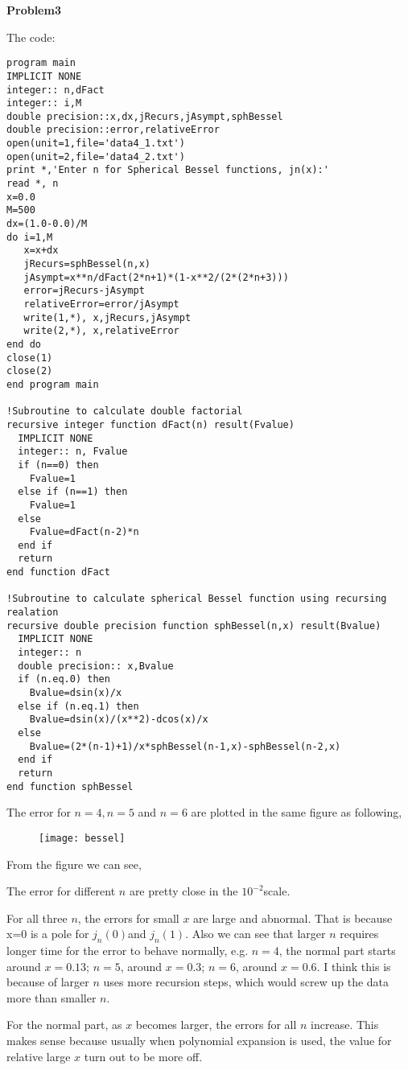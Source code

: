\documentclass{article}
\begin{document}
\vskip 2cm

\textbf{Problem3}

The code:
\begin{verbatim}
program main
IMPLICIT NONE
integer:: n,dFact
integer:: i,M
double precision::x,dx,jRecurs,jAsympt,sphBessel
double precision::error,relativeError
open(unit=1,file='data4_1.txt')
open(unit=2,file='data4_2.txt')
print *,'Enter n for Spherical Bessel functions, jn(x):'
read *, n
x=0.0
M=500
dx=(1.0-0.0)/M
do i=1,M
   x=x+dx
   jRecurs=sphBessel(n,x)
   jAsympt=x**n/dFact(2*n+1)*(1-x**2/(2*(2*n+3)))
   error=jRecurs-jAsympt
   relativeError=error/jAsympt
   write(1,*), x,jRecurs,jAsympt
   write(2,*), x,relativeError
end do
close(1)
close(2)
end program main

!Subroutine to calculate double factorial
recursive integer function dFact(n) result(Fvalue)
  IMPLICIT NONE
  integer:: n, Fvalue
  if (n==0) then
    Fvalue=1
  else if (n==1) then
    Fvalue=1
  else
    Fvalue=dFact(n-2)*n
  end if
  return
end function dFact

!Subroutine to calculate spherical Bessel function using recursing realation
recursive double precision function sphBessel(n,x) result(Bvalue)
  IMPLICIT NONE
  integer:: n
  double precision:: x,Bvalue
  if (n.eq.0) then
    Bvalue=dsin(x)/x
  else if (n.eq.1) then
    Bvalue=dsin(x)/(x**2)-dcos(x)/x
  else
    Bvalue=(2*(n-1)+1)/x*sphBessel(n-1,x)-sphBessel(n-2,x)
  end if
  return
end function sphBessel
\end{verbatim}

\vskip 1cm

The error  for $n=4, n=5$ and $n=6$ are plotted in the same figure as following,
\begin{figure} [ht]
\texttt{[image: bessel]}
\end{figure}

From the figure we can see,

The error for different $n$ are pretty close in the $10^{-2}$scale.   

For all three $n$, the errors for small $x$ are large and abnormal.  That is because x=0 is a pole for $j_n(0)$and $j_n(1)$.  Also we can see that larger $n$ requires longer time for the error to behave normally, e.g. $n=4$, the normal part starts around $x=0.13$; $n=5$, around $x=0.3$; $n=6$, around $x=0.6$.   I think this is because of larger $n$ uses more recursion steps, which would screw up the data more than smaller $n$.

For the normal part,  as $x$ becomes larger, the errors for all $n$ increase.  This makes sense because usually when polynomial expansion is used, the value for relative large $x$ turn out to be more off.
\end{document}
